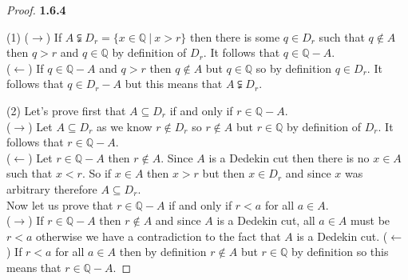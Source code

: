 \documentclass[11pt]{article}
\newcommand{\Q}{\mathbb{Q}}
\theoremstyle{definition}
\begin{document}
\cleardoublepage
    \begin{proof}{\textbf{1.6.4}}
        \item [(1)] ($\rightarrow$) If $A \subsetneqq D_r = \{x \in \Q ~|~ x>r\}$ then
        there is some $q \in D_r$ such that $q \notin A$ then $q>r$ and $q \in \Q$ by
        definition of $D_r$. It follows that $q \in \Q - A$.\\
        ($\leftarrow$) If $q \in \Q - A$ and $q > r$ then $q \notin A$ but $q \in \Q$ so
        by definition $q \in D_r$. It follows that $q \in D_r - A$ but this means that
        $A \subsetneqq D_r$.
        \item [(2)] Let's prove first that $A \subseteq D_r$ if and only if $r \in \Q -A$.\\
        ($\rightarrow$) Let $A \subseteq D_r$ as we know $r \notin D_r$ so $r \notin A$
        but $r \in \Q$ by definition of $D_r$. It follows that $r \in \Q - A$.\\
        ($\leftarrow$) Let $r \in \Q - A$ then $r \notin A$. Since $A$ is a Dedekin cut
        then there is no $x \in A$ such that $x<r$. So if $x \in A$ then $x>r$ but then
        $x \in D_r$ and since $x$ was arbitrary therefore $A \subseteq D_r$.\\
        Now let us prove that $r \in \Q-A$ if and only if $r<a$ for all $a \in A$.\\
        ($\rightarrow$) If $r \in \Q - A$ then $r \notin A$ and since $A$ is a Dedekin
        cut, all $a \in A$ must be $r<a$ otherwise we have a contradiction to the fact
        that $A$ is a Dedekin cut.
        ($\leftarrow$) If $r<a$ for all $a \in A$ then by definition $r \notin A$ but
        $r \in \Q$ by definition so this means that $r \in \Q-A$.
    \end{proof}
\end{document}

